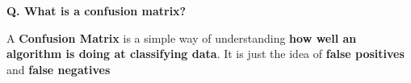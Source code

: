 \begin{frame}[fragile]{\textbf{Q. What is a confusion matrix?}}
  \begin{wideitemize}
  \item A \textbf{Confusion Matrix} is a simple way of understanding \textbf{how well an
      algorithm is doing at classifying data}. It is just the idea of \textbf{false
      positives} and \textbf{false negatives}
    \begin{flushleft}
    \end{flushleft}
  \end{wideitemize}
\end{frame}

